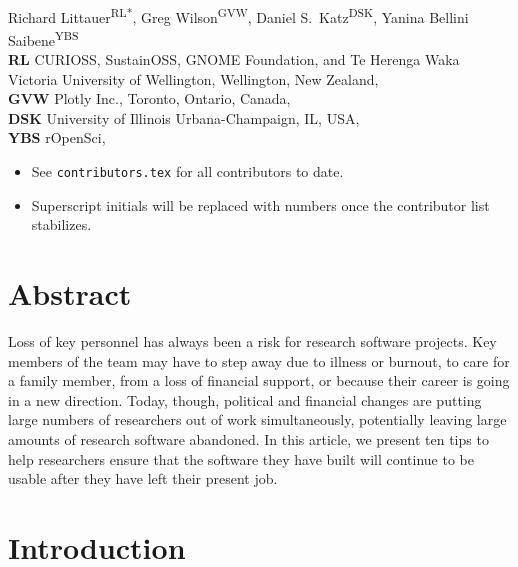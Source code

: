 \documentclass[10pt,letterpaper]{article}
\begin{document}
\vspace*{0.2in}

\begin{flushleft}
{\Large
\textbf{}
}
\newline
\\
Richard Littauer\textsuperscript{RL*},
Greg Wilson\textsuperscript{GVW},
Daniel S.\ Katz\textsuperscript{DSK},
Yanina Bellini Saibene\textsuperscript{YBS}
\\
\bigskip
\textbf{RL} CURIOSS, SustainOSS, GNOME Foundation, and Te Herenga Waka Victoria University of Wellington, Wellington, New Zealand, \\
\textbf{GVW} Plotly Inc., Toronto, Ontario, Canada, \\
\textbf{DSK} University of Illinois Urbana-Champaign, IL, USA, \\
\textbf{YBS} rOpenSci, 
\end{flushleft}

\begin{itemize}
\item
  See \texttt{contributors.tex} for all contributors to date.
\item
  Superscript initials will be replaced with numbers once the contributor list stabilizes.
\end{itemize}

\section*{Abstract}

Loss of key personnel has always been a risk for research software projects.
Key members of the team may have to step away due to illness or burnout,
to care for a family member,
from a loss of financial support,
or because their career is going in a new direction.
Today,
though,
political and financial changes are putting large numbers of researchers out of work simultaneously,
potentially leaving large amounts of research software abandoned.
In this article,
we present ten tips to help researchers ensure that
the software they have built will continue to be usable
after they have left their present job.

\linenumbers

\section*{Introduction}
\end{document}
